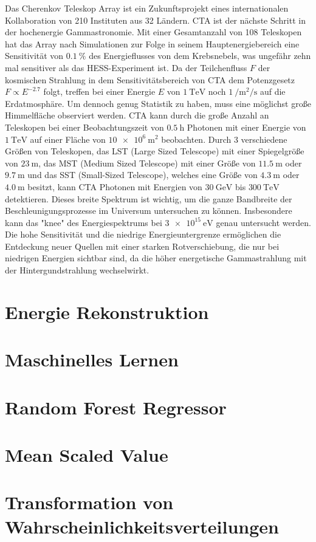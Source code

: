 Das Cherenkov Teleskop Array ist ein Zukunftsprojekt eines internationalen Kollaboration von 210 Instituten aus 32 Ländern\cite{CTA_consortium}.
CTA ist der nächste Schritt in der hochenergie Gammastronomie.
Mit einer Gesamtanzahl von 108 Teleskopen hat das Array nach Simulationen zur Folge in seinem Hauptenergiebereich eine Sensitivität von $\SI{0.1}{\percent}$
des Energieflusses von dem Krebsnebels, was ungefähr zehn mal sensitiver als das HESS-Experiment ist\cite{CTA_paper}.
Da der Teilchenfluss $F$ der kosmischen Strahlung in dem Sensitivitätsbereich von CTA dem Potenzgesetz $F \propto E^{-2.7}$\cite[5]{Cosmic_rays} folgt,
treffen bei einer Energie $E$ von $\SI{1}{\tera\eV}$ noch $\SI{1}{\per\m\squared\per\s}$ auf die Erdatmosphäre.
Um dennoch genug Statistik zu haben, muss eine möglichst große Himmelfläche observiert werden.
CTA kann durch die große Anzahl an Teleskopen bei einer Beobachtungszeit von $\SI{0.5}{\hour}$ Photonen mit einer Energie von $\SI{1}{\tera\eV}$ auf einer
Fläche von $\SI{10e6}{\m\squared}$\cite{CTA_ob} beobachten.
Durch 3 verschiedene Größen von Teleskopen, das LST (Large Sized Telescope) mit einer Spiegelgröße von $\SI{23}{\m}$, das MST (Medium Sized Telescope)
mit einer Größe von $\SI{11.5}{\m}$ oder $\SI{9.7}{\m}$ und das SST (Small-Sized Telescope), welches eine Größe von $\SI{4.3}{\m}$ oder $\SI{4.0}{\m}$
besitzt, kann CTA Photonen mit Energien von $\SI{30}{\giga\eV}$ bis $\SI{300}{\tera\eV}$ detektieren.
Dieses breite Spektrum ist wichtig, um die ganze Bandbreite der Beschleunigungsprozesse im Universum untersuchen zu können.
Insbesondere kann das "knee" des Energiespektrums bei $\SI{3e15}{\eV}$ genau untersucht werden.
Die hohe Sensitivität und die niedrige Energieuntergrenze ermöglichen die Entdeckung neuer Quellen mit einer starken Rotverschiebung, die nur bei niedrigen
Energien sichtbar sind, da die höher energetische Gammastrahlung mit der Hintergundstrahlung wechselwirkt.

\section{Energie Rekonstruktion}

\section{Maschinelles Lernen}

\section{Random Forest Regressor}

\section{Mean Scaled Value}


\section{Transformation von Wahrscheinlichkeitsverteilungen}
